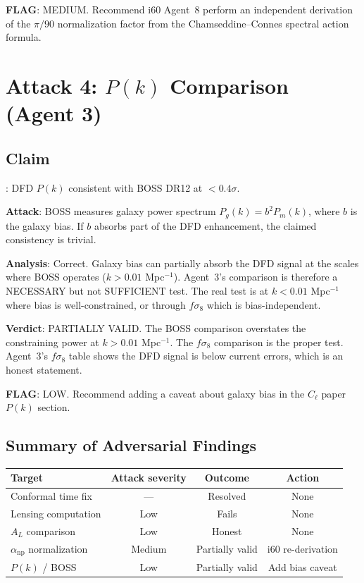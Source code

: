 \documentclass[11pt,a4paper]{article}
\begin{document}
\textbf{FLAG}: MEDIUM. Recommend i60 Agent~8 perform an independent derivation of the $\pi/90$ normalization factor from the Chamseddine--Connes spectral action formula.

\section{Attack 4: $P(k)$ Comparison (Agent 3)}

\subsection{Claim}: DFD $P(k)$ consistent with BOSS DR12 at $< 0.4\sigma$.

\textbf{Attack}: BOSS measures galaxy power spectrum $P_g(k) = b^2 P_m(k)$, where $b$ is the galaxy bias. If $b$ absorbs part of the DFD enhancement, the claimed consistency is trivial.

\textbf{Analysis}: Correct. Galaxy bias can partially absorb the DFD signal at the scales where BOSS operates ($k > 0.01$ Mpc$^{-1}$). Agent~3's comparison is therefore a NECESSARY but not SUFFICIENT test. The real test is at $k < 0.01$ Mpc$^{-1}$ where bias is well-constrained, or through $f\sigma_8$ which is bias-independent.

\textbf{Verdict}: PARTIALLY VALID. The BOSS comparison overstates the constraining power at $k > 0.01$ Mpc$^{-1}$. The $f\sigma_8$ comparison is the proper test. Agent~3's $f\sigma_8$ table shows the DFD signal is below current errors, which is an honest statement.

\textbf{FLAG}: LOW. Recommend adding a caveat about galaxy bias in the $C_\ell$ paper $P(k)$ section.

\subsection{Summary of Adversarial Findings}

\begin{center}
\begin{tabular}{lccc}
\toprule
\textbf{Target} & \textbf{Attack severity} & \textbf{Outcome} & \textbf{Action} \\
\midrule
Conformal time fix & --- & Resolved & None \\
Lensing computation & Low & Fails & None \\
$A_L$ comparison & Low & Honest & None \\
$\alpha_{\mathrm{np}}$ normalization & Medium & Partially valid & i60 re-derivation \\
$P(k)$ / BOSS & Low & Partially valid & Add bias caveat \\
\bottomrule
\end{tabular}
\end{center}
\end{document}
